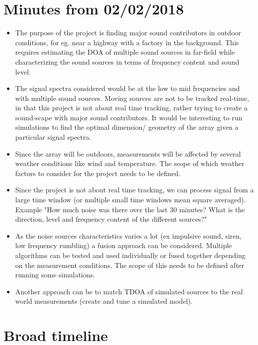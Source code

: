 \section{Minutes from 02/02/2018}

\begin{itemize}
    \item The purpose of the project is finding major sound contributors in outdoor conditions, for eg. near a highway with a factory in the background. This requires estimating the DOA of multiple sound sources in far-field while characterizing the sound sources in terms of frequency content and sound level.
    \item The signal spectra considered would be at the low to mid frequencies and with multiple sound sources. Moving sources are not to be tracked real-time, in that this project is not about real time tracking, rather trying to create a sound-scape with major sound contributors. It would be interesting to run simulations to find the optimal dimension/ geometry of the array given a particular signal spectra.
    \item Since the array will be outdoors, measurements will be affected by several weather conditions like wind and temperature. The scope of which weather factors to consider for the project needs to be defined.
    \item Since the project is not about real time tracking, we can process signal from a large time window (or multiple small time windows mean square averaged). Example "How much noise was there over the last 30 minutes? What is the direction, level and frequency content of the different sources?"
    \item As the noise sources characteristics varies a lot (ex impulsive sound, siren, low frequency rumbling) a fusion approach can be considered. Multiple algorithms can be tested and used individually or fused together depending on the measurement conditions. The scope of this needs to be defined after running some simulations.
    \item Another approach can be to match TDOA of simulated sources to the real world measurements (create and tune a simulated model).
\end{itemize}

\section{Broad timeline}

